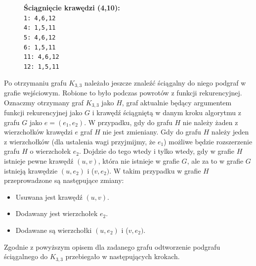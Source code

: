 \documentclass[a4 122pt]{article}
\begin{document}
\begin{figure}[H]
\centering
{}
\caption*
{\textbf{Ściągnięcie krawędzi (4,10):}\\
\texttt
{1: 4,6,12\\
4: 1,5,11\\
5: 4,6,12\\
6: 1,5,11\\
11: 4,6,12\\
12: 1,5,11}}
\end{figure} 


Po otrzymaniu grafu $K_{3,3}$ należało jeszcze znaleźć ściągalny do niego podgraf w grafie wejściowym. Robione to było podczas powrotów z funkcji rekurencyjnej. Oznaczmy otrzymany graf $K_{3,3}$ jako $H$, graf 
aktualnie będący argumentem funkcji rekurencyjnej jako $G$  i krawędź ściągniętą w danym kroku algorytmu z grafu $G$ jako $e = (e_1, e_2)$. 
W przypadku, gdy do grafu $H$ nie należy żaden z wierzchołków krawędzi $e$ graf $H$ nie jest zmieniany.
Gdy do grafu $H$ należy jeden z wierzchołków (dla ustalenia wagi przyjmijmy, że $e_1$) możliwe będzie rozszerzenie grafu $H$ o wierzchołek $e_2$. Dojdzie do tego wtedy i tylko wtedy, gdy w grafie $H$ istnieje pewne krawędź 
$(u,v)$, która nie istnieje w grafie $G$, ale za to w grafie $G$ istnieją krawędzie $(u,e_2)$ i ($v,e_2)$.  W takim przypadku w grafie $H$ przeprowadzone są następujące zmiany:
\begin{itemize}
\item Usuwana jest krawędź $(u,v)$.
\item Dodawany jest wierzchołek $e_2$.
\item Dodawane są wierzchołki $(u,e_2)$ i ($v,e_2)$.
\end{itemize} 

Zgodnie z powyższym opisem dla zadanego grafu odtworzenie podgrafu ściągalnego do $K_{3,3}$ przebiegało w następujących krokach. 
\end{document}
